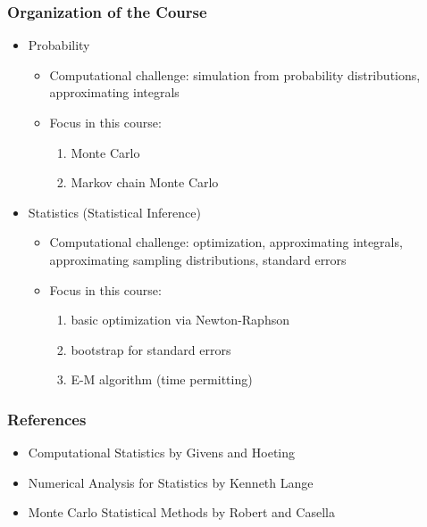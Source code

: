\documentclass{beamer}
\title[Spatial Models and Computation] %
{A Short Course on Computationally Intensive Probability and Statistics}
\author{Murali Haran}
\institute[Penn State] %
{
  Department of Statistics\\
  Penn State University\\
\vspace{0.2in}
}
\date[SOS 03-2006] %
{University of Split\\ September 2017}
\begin{document}
\begin{frame}
  \titlepage
\end{frame}


\begin{frame}
  \frametitle{Organization of the Course}
\begin{itemize}
\item Probability
\begin{itemize}
\item Computational challenge: simulation from probability 
  distributions, approximating integrals 
\item Focus in this course: 
\begin{enumerate}
\item Monte Carlo 
\item Markov chain Monte Carlo
\end{enumerate}
\end{itemize}
\item Statistics (Statistical Inference)
\begin{itemize}
\item Computational challenge: optimization, approximating integrals,
  approximating sampling distributions, standard errors
\item Focus in this course: 
\begin{enumerate}
\item basic optimization via Newton-Raphson
\item bootstrap for standard errors
\item E-M algorithm (time permitting)
\end{enumerate}
\end{itemize}
\end{itemize}
\end{frame}

\begin{frame}
  \frametitle{References}
\begin{itemize}
\item Computational Statistics by Givens and Hoeting
\item Numerical Analysis for Statistics by Kenneth Lange
\item Monte Carlo Statistical Methods by Robert and Casella
\end{itemize}
\end{frame}
\end{document}
